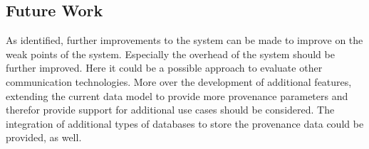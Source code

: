     

\subsection{Future Work}
As identified, further improvements to the system can be made to improve on the weak points of the system. Especially the overhead of the system should be further improved. Here it could be a possible approach to evaluate other communication technologies. More over the development of additional features, extending the current data model to provide more provenance parameters and therefor provide support for additional use cases should be considered. The integration of additional types of databases to store the provenance data could be provided, as well. 


